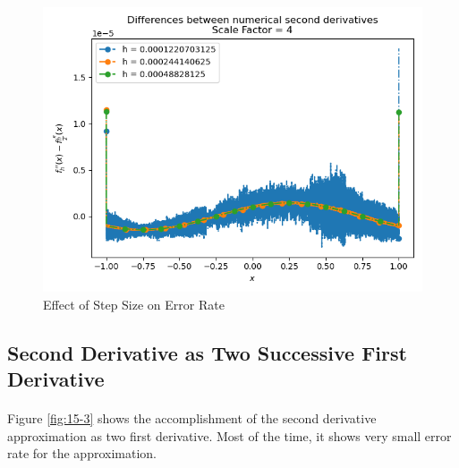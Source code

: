 \documentclass[letterpaper,12pt]{article}
\begin{document}
\begin{figure}[H]
\centerline{\includegraphics[width=0.7\linewidth]{figures/15-2.png}}
\caption{Effect of Step Size on Error Rate}
\label{fig:15-2}
\end{figure}

\subsection{Second Derivative as Two Successive First Derivative}
\paragraph{} Figure \ref{fig:15-3} shows the accomplishment of the second derivative approximation as two first derivative. Most of the time, it shows very small error rate for the approximation.
\end{document}
